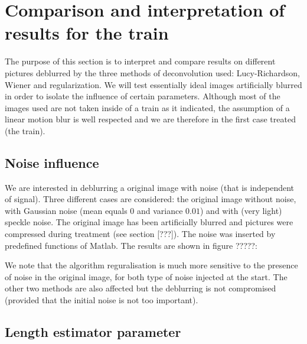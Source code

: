 
\section{Comparison and interpretation of results for the train}

The purpose of this section is to interpret and compare results on different pictures deblurred by the three methods of deconvolution used: Lucy-Richardson, Wiener and regularization. We will test essentially ideal images artificially blurred in order to isolate the influence of certain parameters. Although most of the images used are not taken inside of a train as it indicated, the assumption of a linear motion blur is well respected and we are therefore in the first case treated (the train).

\subsection{Noise influence}

We are interested in deblurring a original image with noise (that is independent of signal). Three different cases are considered: the original image without noise, with Gaussian noise (mean equals $0$ and variance $0.01$) and with (very light) speckle noise. The original image has been artificially blurred and pictures were compressed during treatment (see section [???]). The noise was inserted by predefined functions of Matlab. The results are shown in figure ?????:



We note that the algorithm reguralisation is much more sensitive to the presence of noise in the original image, for both type of noise injected at the start. The other two methods are also affected but the deblurring is not compromised (provided that the initial noise is not too important).


\subsection{Length estimator parameter}

